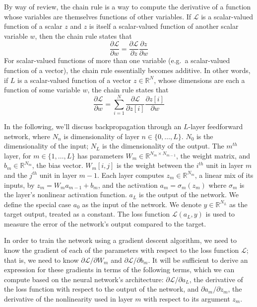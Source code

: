 By way of review, the chain rule is a way to compute the derivative of a function whose variables are themselves functions of other variables.
If $\mathcal{L}$ is a scalar-valued function of a scalar $z$ and $z$ is itself a scalar-valued function of another scalar variable $w$, then the chain rule states that
\begin{equation}
\frac{\partial \mathcal{L}}{\partial w} = \frac{\partial \mathcal{L}}{\partial z}\frac{\partial z}{\partial w}
\end{equation}
For scalar-valued functions of more than one variable (e.g.\ a scalar-valued function of a vector), the chain rule essentially becomes additive.
In other words, if $L$ is a scalar-valued function of a vector $z \in \mathbb{R}^N$, whose dimensions are each a function of some variable $w$, the chain rule states that
\begin{equation}
\frac{\partial \mathcal{L}}{\partial w} = \sum_{i = 1}^N \frac{\partial \mathcal{L}}{\partial z[i]}\frac{\partial z[i]}{\partial w}
\end{equation}

In the following, we'll discuss backpropagation through an $L$-layer feedforward network, where $N_n$ is dimensionality of layer $n \in \{0, \ldots, L\}$.
$N_0$ is the dimensionality of the input; $N_L$ is the dimensionality of the output.
The $m^{th}$ layer, for $m \in \{1, \ldots, L\}$ has parameters $W_m \in \mathbb{R}^{N_m \times N_{m - 1}}$, the weight matrix, and $b_m \in \mathbb{R}^{N_m}$, the bias vector.
$W_m[i, j]$ is the weight between the $i^{th}$ unit in layer $m$ and the $j^{th}$ unit in layer $m - 1$.
Each layer computes $z_m \in \mathbb{R}^{N_m}$, a linear mix of its inputs, by $z_m = W_m a_{m - 1} + b_m$, and the activation $a_m = \sigma_m(z_m)$ where $\sigma_m$ is the layer's nonlinear activation function.
$a_L$ is the output of the network.
We define the special case $a_0$ as the input of the network.
We denote $y \in \mathbb{R}^{N_L}$ as the target output, treated as a constant.
The loss function $\mathcal{L}(a_L, y)$ is used to measure the error of the network's output compared to the target.

In order to train the network using a gradient descent algorithm, we need to know the gradient of each of the parameters with respect to the loss function $\mathcal{L}$; that is, we need to know $\partial \mathcal{L}/\partial W_m$ and $\partial \mathcal{L}/\partial b_m$.
It will be sufficient to derive an expression for these gradients in terms of the following terms, which we can compute based on the neural network's architecture: $\partial \mathcal{L}/\partial a_L$, the derivative of the loss function with respect to the output of the network, and $\partial a_m/\partial z_m$, the derivative of the nonlinearity used in layer $m$ with respect to its argument $z_m$.

